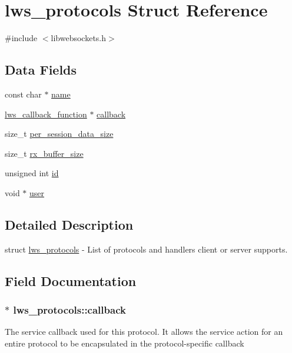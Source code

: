 \hypertarget{structlws__protocols}{}\section{lws\+\_\+protocols Struct Reference}
\label{structlws__protocols}


{\ttfamily \#include $<$libwebsockets.\+h$>$}

\subsection*{Data Fields}
\begin{DoxyCompactItemize}
\item 
const char $\ast$ \hyperlink{structlws__protocols_a0e63edb457a613c3fa4271e0a8f19624}{name}
\item 
\hyperlink{group__usercb_gad4fcb82e68d60ffacca61a3f783a0a2f}{lws\+\_\+callback\+\_\+function} $\ast$ \hyperlink{structlws__protocols_acabf94c1a9bfe7be0387fbb0e0c56b2d}{callback}
\item 
size\+\_\+t \hyperlink{structlws__protocols_a9bbd85f591ffb4259711cb5acbb05bea}{per\+\_\+session\+\_\+data\+\_\+size}
\item 
size\+\_\+t \hyperlink{structlws__protocols_a0d1d4996d81b2f5e125bcec981e461c5}{rx\+\_\+buffer\+\_\+size}
\item 
unsigned int \hyperlink{structlws__protocols_a6b632018590c2b1bbe43fbab6d5e6fac}{id}
\item 
void $\ast$ \hyperlink{structlws__protocols_a3cbd903ad076736ae934a54cae36580e}{user}
\end{DoxyCompactItemize}


\subsection{Detailed Description}
struct \hyperlink{structlws__protocols}{lws\+\_\+protocols} -\/ List of protocols and handlers client or server supports. 

\subsection{Field Documentation}
\subsubsection[{\texorpdfstring{callback}{callback}}]{$\ast$ lws\+\_\+protocols\+::callback}\hypertarget{structlws__protocols_acabf94c1a9bfe7be0387fbb0e0c56b2d}{}\label{structlws__protocols_acabf94c1a9bfe7be0387fbb0e0c56b2d}
The service callback used for this protocol. It allows the service action for an entire protocol to be encapsulated in the protocol-\/specific callback 
